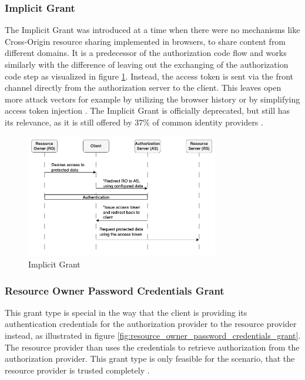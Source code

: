 \documentclass[
    fontsize=12pt,
    headings=small,
    parskip=half,           %
    bibliography=totoc,
    numbers=noenddot,       %
    open=any,               %
    ]{scrreprt}
\begin{document}
\subsubsection{Implicit Grant}
The Implicit Grant was introduced at a time when there were no mechanisms like Cross-Origin resource sharing implemented in browsers, to share content from different domains. It is a predecessor of the authorization code flow and works similarly with the difference of leaving out the exchanging of the
authorization code step as visualized in figure \ref{fig:implicit_grant}. Instead, the access token is sent via the front
channel directly from the authorization server to the client. This leaves open more attack vectors for example by utilizing the browser history or by
simplifying access token injection \cite{lodderstedt2020oauth}. The Implicit
Grant is officially deprecated, but still has its relevance, as it is still
offered by 37\% of common identity providers \cite{philippaerts2022oauch}.

\begin{figure}[ht]
	\sffamily\footnotesize
	\includegraphics[width=0.75\textwidth]{pic/implicit_grant.png}
	\unitlength=0.75mm
	\linethickness{0.4pt}
	\caption{Implicit Grant}
	\label{fig:implicit_grant}
\end{figure}

\subsubsection{Resource Owner Password Credentials Grant}
This grant type is special in the way that the client is providing its
authentication credentials for the authorization provider to the resource
provider instead, as illustrated in figure \ref{fig:resource_owner_password_credentials_grant}. The resource provider than uses the credentials to retrieve
authorization from the authorization provider. This grant type is only feasible
for the scenario, that the resource provider is trusted completely \cite[Sec.
4.3.]{hardt2012rfc}.
\end{document}
